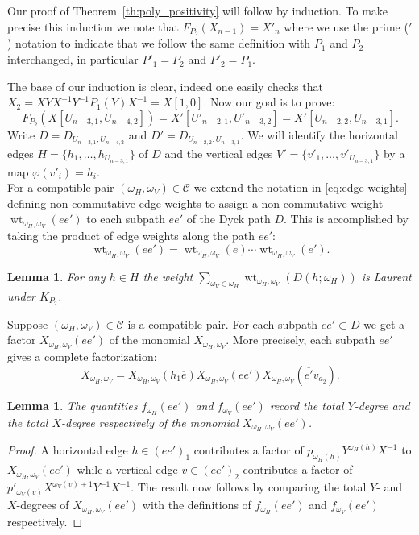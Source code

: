 \documentclass{amsart}
\newtheorem{lemma}[theorem]{Lemma}
\newcommand{\cC}{\mathcal{C}}
\newcommand{\wt}{\operatorname{wt}}
\begin{document}
 Our proof of Theorem~\ref{th:poly_positivity} will follow by induction.  To make precise this induction we note that $F_{P_2}(X_{n-1})=X'_n$ where we use the prime ($'$) notation to indicate that we follow the same definition with $P_1$ and $P_2$ interchanged, in particular $P'_1=P_2$ and $P'_2=P_1$.

 The base of our induction is clear, indeed one easily checks that $X_2=XYX^{-1}Y^{-1}P_1(Y)X^{-1}=X[1,0]$.  Now our goal is to prove:
 \[F_{P_2}(X[U_{n-3,1},U_{n-4,2}])=X'[U'_{n-2,1},U'_{n-3,2}]=X'[U_{n-2,2},U_{n-3,1}].\]
 Write $D=D_{U_{n-3,1},U_{n-4,2}}$ and $D'=D_{U_{n-2,2},U_{n-3,1}}$.  We will identify the horizontal edges $H=\{h_1,\ldots,h_{U_{n-3,1}}\}$ of $D$ and the vertical edges $V'=\{v'_1,\ldots,v'_{U_{n-3,1}}\}$ by a map $\varphi(v'_i)=h_i$.\\
 
 For a compatible pair $(\omega_H,\omega_V)\in\cC$ we extend the notation in \eqref{eq:edge weights} defining non-commutative edge weights to assign a non-commutative weight $\wt_{\omega_H,\omega_V}(ee')$ to each subpath $ee'$ of the Dyck path $D$.  This is accomplished by taking the product of edge weights along the path $ee'$:
 \begin{equation}\label{eq:path weights}
  \wt_{\omega_H,\omega_V}(ee')=\wt_{\omega_H,\omega_V}(e)\cdots\wt_{\omega_H,\omega_V}(e').
 \end{equation}
 \begin{lemma}
  For any $h\in H$ the weight $\sum\limits_{\omega_V\in\overline{\omega_H}}\wt_{\omega_H,\omega_V}(D(h;\omega_H))$ is Laurent under $K_{P_2}$.
 \end{lemma}

 Suppose $(\omega_H,\omega_V)\in\cC$ is a compatible pair.  For each subpath $ee'\subset D$ we get a factor $X_{\omega_H,\omega_V}(ee')$ of the monomial $X_{\omega_H,\omega_V}$.  More precisely, each subpath $ee'$ gives a complete factorization:
 \[X_{\omega_H,\omega_V}=X_{\omega_H,\omega_V}(h_1\overline{e})X_{\omega_H,\omega_V}(ee')X_{\omega_H,\omega_V}(\overline{e'}v_{a_2}).\]
 \begin{lemma}
  The quantities $f_{\omega_H}(ee')$ and $f_{\omega_V}(ee')$ record the total $Y$-degree and the total $X$-degree respectively of the monomial $X_{\omega_H,\omega_V}(ee')$.
 \end{lemma}
 \begin{proof}
  A horizontal edge $h\in(ee')_1$ contributes a factor of $p_{\omega_H(h)}Y^{\omega_H(h)}X^{-1}$ to $X_{\omega_H,\omega_V}(ee')$ while a vertical edge $v\in(ee')_2$ contributes a factor of $p'_{\omega_V(v)}X^{\omega_V(v)+1}Y^{-1}X^{-1}$.  The result now follows by comparing the total $Y$- and $X$-degrees of $X_{\omega_H,\omega_V}(ee')$ with the definitions of $f_{\omega_H}(ee')$ and $f_{\omega_V}(ee')$ respectively.
 \end{proof}
\end{document}
